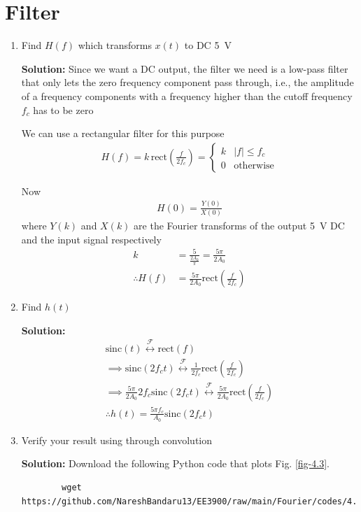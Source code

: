 \documentclass[journal,12pt,twocolumn]{IEEEtran}
\newcommand{\solution}{\noindent \textbf{Solution: }}
\providecommand{\abs}[1]{\left\vert#1\right\vert}
\providecommand{\system}[1]{\overset{\mathcal{#1}}{ \longleftrightarrow}}
\providecommand{\rect}[1]{\mathrm{rect}\ensuremath{\left(#1\right)}}
\providecommand{\sinc}[1]{\mathrm{sinc}\ensuremath{\left(#1\right)}}
\numberwithin{equation}{section}
\numberwithin{figure}{section}
\renewcommand\thesection{\arabic{section}}
\begin{document}
	\section{Filter}
	\begin{enumerate}[label=\thesection.\arabic*,ref=\thesection.\theenumi]
	\item Find $H(f)$ which transforms $x(t)$ to DC \SI{5}{\volt}
	
	\solution Since we want a DC output, the filter we need is a low-pass filter that only lets the zero frequency component pass through, i.e., the amplitude of a  frequency components with a frequency higher than the cutoff frequency $f_c$ has to be zero
	
	We can use a rectangular filter for this purpose
	\begin{align}
		H(f) = k\,\rect{\frac{f}{2f_c}} =
		\begin{cases}
			k & \abs{f} \le f_c \\
			0 & \text{otherwise}
		\end{cases}
	\end{align}
	
	Now
	\begin{align}
		H(0) = \frac{Y(0)}{X(0)}
	\end{align}
	where $Y(k)$ and $X(k)$ are the Fourier transforms of the output \SI{5}{\volt} DC and the input signal respectively
	\begin{align}
		k &= \frac{5}{\frac{2A_0}{\pi}} = \frac{5\pi}{2A_0} \\
		\therefore H(f) &= \frac{5\pi}{2A_0}\rect{\frac{f}{2f_c}}
	\end{align}
	
	
	\item Find $h(t)$
	
	\solution 
	\begin{gather}
		\sinc{t} \system{F} \rect{f} \\
		\implies \sinc{2f_ct} \system{F} \frac{1}{2f_c}\rect{\frac{f}{2f_c}} \\
		\implies \frac{5\pi}{2A_0} 2f_c \sinc{2f_ct} \system{F} \frac{5\pi}{2A_0}\rect{\frac{f}{2f_c}} \\
		\therefore h(t) = \frac{5\pi f_c}{A_0} \sinc{2f_ct}
	\end{gather}
	
	\item Verify your result using  through convolution
	
	\solution Download the following Python code that plots Fig. \ref{fig-4.3}.
	\begin{lstlisting}
		wget https://github.com/NareshBandaru13/EE3900/raw/main/Fourier/codes/4.3.py
	\end{lstlisting}
	

\end{enumerate}
\end{document}
